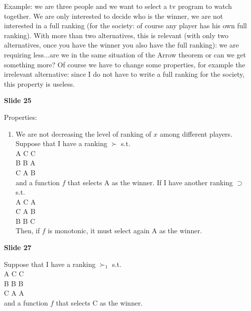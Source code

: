 \documentclass[pt11,a4paper,twoside,reqno,openright]{paper}
\begin{document}
\noindent Example: we are three people and we want to select a tv program to 
watch together. We are only interested to decide who is the winner, we are not 
interested in a full ranking (for the society: of course any player has his 
own full ranking). With more than two alternatives, this is relevant (with only 
two alternatives, once you have the winner you also have the full ranking): we 
are requiring less...are we in the same situation of the Arrow theorem or can 
we get something more? Of course we have to change some properties, for example 
the irrelevant alternative: since I do not have to write a full ranking for the 
society, this property is useless.

\bigskip
\noindent \textbf{Slide 25}

\noindent Properties:
\begin{enumerate}
	\item We are not decreasing the level of ranking of $x$ among different 
	players. Suppose that I have a ranking $\succ$ s.t.\\
	A \hspace{.6cm} C \hspace{.6cm} C\\
	B \hspace{.6cm} B \hspace{.6cm} A\\
	C \hspace{.6cm} A \hspace{.6cm} B\\
	and a function $f$ that selects A as the winner. If I have another ranking 
	$\supset$ s.t.\\
	A \hspace{.6cm} C \hspace{.6cm} A\\
	C \hspace{.6cm} A \hspace{.6cm} B\\
	B \hspace{.6cm} B \hspace{.6cm} C\\
	Then, if $f$ is monotonic, it must select again A as the winner.
\end{enumerate}

\bigskip
\noindent \textbf{Slide 27}

\noindent Suppose that I have a ranking $\succ_1$ s.t.\\
A \hspace{.6cm} C \hspace{.6cm} C\\
B \hspace{.6cm} B \hspace{.6cm} B\\
C \hspace{.6cm} A \hspace{.6cm} A\\
and a function $f$ that selects C as the winner.
\end{document}
